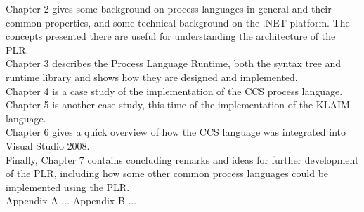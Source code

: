 Chapter 2 gives some background on process languages in general and their common properties, and some technical background on the .NET platform. The concepts presented there are useful for understanding the architecture of the PLR.\\
Chapter 3 describes the Process Language Runtime, both the syntax tree and runtime library and shows how they are designed and implemented. \\
Chapter 4 is a case study of the implementation of the CCS process language.\\
Chapter 5 is another case study, this time of the implementation of the KLAIM language.\\
Chapter 6 gives a quick overview of how the CCS language was integrated into Visual Studio 2008. \\
Finally, Chapter 7 contains concluding remarks and ideas for further development of the PLR, including how some other common process languages could be implemented using the PLR.\\

Appendix A ...
Appendix B ...